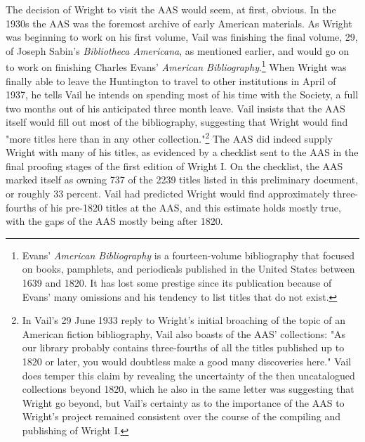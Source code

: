 The decision of Wright to visit the AAS would seem, at first, obvious. In the 1930s the AAS was the foremost archive of early American materials. As Wright was beginning to work on his first volume, Vail was finishing the final volume, 29, of Joseph Sabin's \textit{Bibliotheca Americana}, as mentioned earlier, and would go on to work on finishing Charles Evans' \textit{American Bibliography}.\footnote{Evans' \textit{American Bibliography} is a fourteen-volume bibliography that focused on books, pamphlets, and periodicals published in the United States between 1639 and 1820. It has lost some prestige since its publication because of Evans' many omissions and his tendency to list titles that do not exist.} When Wright was finally able to leave the Huntington to travel to other institutions in April of 1937, he tells Vail he intends on spending most of his time with the Society, a full two months out of his anticipated three month leave.  Vail insists that the AAS itself would fill out most of the bibliography, suggesting that Wright would find "more titles here than in any other collection."\footnote{\autocite{robert_g._vail_letter_1937}
In Vail's 29 June 1933 reply to Wright's initial broaching of the topic of an American fiction bibliography, Vail also boasts of the AAS' collections: "As our library probably contains three-fourths of all the titles published up to 1820 or later, you would doubtless make a good many discoveries here." Vail does temper this claim by revealing the uncertainty of the then uncatalogued collections beyond 1820, which he also in the same letter was suggesting that Wright go beyond, but Vail's certainty as to the importance of the AAS to Wright's project remained consistent over the course of the compiling and publishing of Wright I.} The AAS did indeed supply Wright with many of his titles, as evidenced by a checklist sent to the AAS in the final proofing stages of the first edition of Wright I. On the checklist, the AAS marked itself as owning 737 of the 2239 titles listed in this preliminary document, or roughly 33 percent. Vail had predicted Wright would find approximately three-fourths of his pre-1820 titles at the AAS, and this estimate holds mostly true, with the gaps of the AAS mostly being after 1820.


